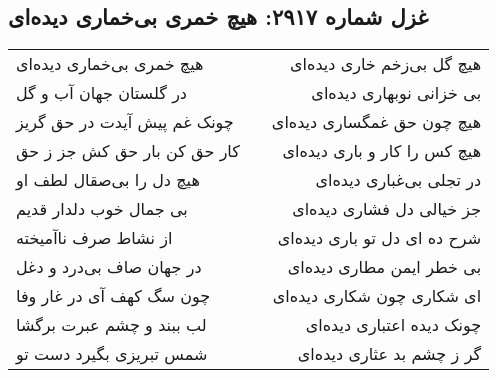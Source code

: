 \begin{center}
\section*{غزل شماره ۲۹۱۷: هیچ خمری بی‌خماری دیده‌ای}
\label{sec:2917}
\begin{longtable}{l p{0.5cm} r}
هیچ خمری بی‌خماری دیده‌ای
&&
هیچ گل بی‌زخم خاری دیده‌ای
\\
در گلستان جهان آب و گل
&&
بی خزانی نوبهاری دیده‌ای
\\
چونک غم پیش آیدت در حق گریز
&&
هیچ چون حق غمگساری دیده‌ای
\\
کار حق کن بار حق کش جز ز حق
&&
هیچ کس را کار و باری دیده‌ای
\\
هیچ دل را بی‌صقال لطف او
&&
در تجلی بی‌غباری دیده‌ای
\\
بی جمال خوب دلدار قدیم
&&
جز خیالی دل فشاری دیده‌ای
\\
از نشاط صرف ناآمیخته
&&
شرح ده ای دل تو باری دیده‌ای
\\
در جهان صاف بی‌درد و دغل
&&
بی خطر ایمن مطاری دیده‌ای
\\
چون سگ کهف آی در غار وفا
&&
ای شکاری چون شکاری دیده‌ای
\\
لب ببند و چشم عبرت برگشا
&&
چونک دیده اعتباری دیده‌ای
\\
شمس تبریزی بگیرد دست تو
&&
گر ز چشم بد عثاری دیده‌ای
\\
\end{longtable}
\end{center}
